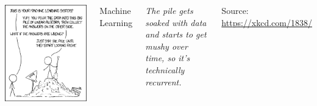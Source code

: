 
\begin{frame}
%
\begin{columns}[T]
\includegraphics[width=\linewidth]{./gfx/xkcd-machineLearning}
%
\begin{Large}
	Machine Learning
	\vspace{12pt}
\end{Large}
%
\begin{center}
	\emph{The pile gets soaked with data and starts to get mushy over time, so it's technically recurrent.}
\end{center}
\begin{center}
	Source: \url{https://xkcd.com/1838/}
\end{center}
\end{columns}
%
\end{frame}


